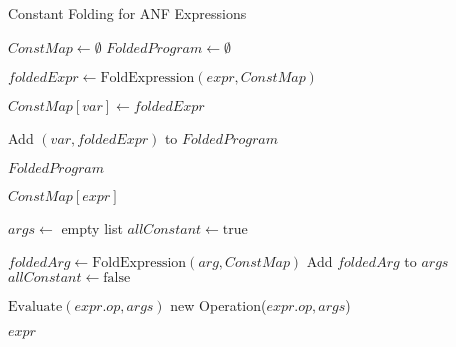 \documentclass[final]{cmpreport_02}
\begin{document}
\begin{algorithm}
\caption{Constant Folding for ANF Expressions}
\label{alg:const-fold}
\begin{algorithmic}[1]
    \State $ConstMap \gets \emptyset$
    \State $FoldedProgram \gets \emptyset$
    
        \State $foldedExpr \gets \text{FoldExpression}(expr, ConstMap)$
        
            \State $ConstMap[var] \gets foldedExpr$
        \EndIf
        
        \State Add $(var, foldedExpr)$ to $FoldedProgram$
    \EndFor
    
    \State \Return $FoldedProgram$
\EndProcedure

        \State \Return $ConstMap[expr]$
        
        \State $args \gets$ empty list
        \State $allConstant \gets \text{true}$
        
            \State $foldedArg \gets \text{FoldExpression}(arg, ConstMap)$
            \State Add $foldedArg$ to $args$
                \State $allConstant \gets \text{false}$
            \EndIf
        \EndFor
        
            \State \Return $\text{Evaluate}(expr.op, args)$
        \Else
            \State \Return new Operation($expr.op, args$)
        \EndIf
        
    \Else
        \State \Return $expr$
    \EndIf
\EndProcedure
\end{algorithmic}
\end{algorithm}
\end{document}
